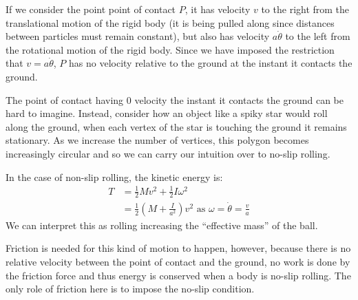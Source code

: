 \documentclass[../main.tex]{subfiles}
\begin{document}
If we consider the point point of contact $P$, it has velocity $v$ to the right from the translational motion of the rigid body (it is being pulled along since distances between particles must remain constant), but also has velocity $a \dot{\theta}$ to the left from the rotational motion of the rigid body.
Since we have imposed the restriction that $v = a \dot{\theta}$, $P$ has no velocity relative to the ground at the instant it contacts the ground.
\begin{remark}[Intuition]
  The point of contact having 0 velocity the instant it contacts the ground can be hard to imagine.
  Instead, consider how an object like a spiky star would roll along the ground, when each vertex of the star is touching the ground it remains stationary.
  As we increase the number of vertices, this polygon becomes increasingly circular and so we can carry our intuition over to no-slip rolling.
\end{remark}

In the case of non-slip rolling, the kinetic energy is:
\begin{align*}
  T &= \frac{1}{2} M v^2 + \frac{1}{2}I\omega^2 \\
    &= \frac{1}{2} \left(M + \frac{I}{a^2}\right)v^2 \text{ as $\omega = \dot{\theta} = \frac{v}{a}$}
\end{align*}
We can interpret this as rolling increasing the ``effective mass'' of the ball.

Friction is needed for this kind of motion to happen, however, because there is no relative velocity between the point of contact and the ground, no work is done by the friction force and thus energy is conserved when a body is no-slip rolling.
The only role of friction here is to impose the no-slip condition.
\end{document}
